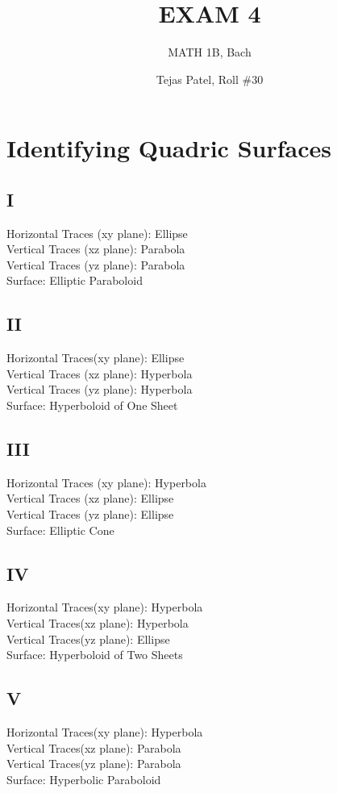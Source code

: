 \documentclass{article}
\title{EXAM 4}
\author{MATH 1B, Bach}
\date{Tejas Patel, Roll \#30}
\begin{document}
\maketitle

    

\section{Identifying Quadric Surfaces}
\subsection*{I}
Horizontal Traces (xy plane): Ellipse \\Vertical Traces (xz plane): Parabola\\Vertical Traces (yz plane): Parabola \\Surface: Elliptic Paraboloid
\subsection*{II}
Horizontal Traces(xy plane): Ellipse \\Vertical Traces (xz plane): Hyperbola\\Vertical Traces (yz plane): Hyperbola \\Surface: Hyperboloid of One Sheet
\subsection*{III}
Horizontal Traces (xy plane): Hyperbola \\Vertical Traces (xz plane): Ellipse\\Vertical Traces (yz plane): Ellipse \\Surface: Elliptic Cone
\subsection*{IV}
Horizontal Traces(xy plane): Hyperbola \\Vertical Traces(xz plane): Hyperbola\\Vertical Traces(yz plane): Ellipse \\Surface: Hyperboloid of Two Sheets
\subsection*{V}
Horizontal Traces(xy plane): Hyperbola \\Vertical Traces(xz plane): Parabola\\Vertical Traces(yz plane): Parabola \\Surface: Hyperbolic Paraboloid
\end{document}
